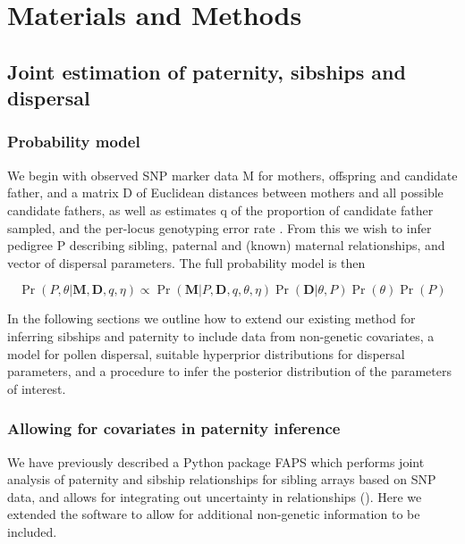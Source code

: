 \documentclass[10pt, a4paper, twocolumn]{article} %
\begin{document}

\section{Materials and Methods}

\subsection{Joint estimation of paternity, sibships and dispersal}

\subsubsection{Probability model}

We begin with observed SNP marker data M for mothers, offspring and candidate father, and a matrix D of Euclidean distances between mothers and all possible candidate fathers, as well as estimates q of the proportion of candidate father sampled, and the per-locus genotyping error rate . From this we wish to infer pedigree P describing sibling, paternal and (known) maternal relationships, and vector  of dispersal parameters. The full probability model is then

\begin{equation}
\label{eqn:probability_model}
\Pr( P, \theta | \textbf{M}, \textbf{D}, q, \eta)
\propto
\Pr(\textbf{M} | P, \textbf{D}, q,\theta, \eta)
\Pr(\textbf{D} | \theta, P)
\Pr(\theta) \Pr(P)
\end{equation}

In the following sections we outline how to extend our existing method for inferring sibships and paternity to include data from non-genetic covariates, a model for pollen dispersal, suitable hyperprior distributions for dispersal parameters, and a procedure to infer the posterior distribution of the parameters of interest.

\subsubsection{Allowing for covariates in paternity inference}

We have previously described a Python package FAPS which performs joint analysis of paternity and sibship relationships for sibling arrays based on SNP data, and allows for integrating out uncertainty in relationships (\cite{ellis2016repeated}). Here we extended the software to allow for additional non-genetic information to be included.
\end{document}
